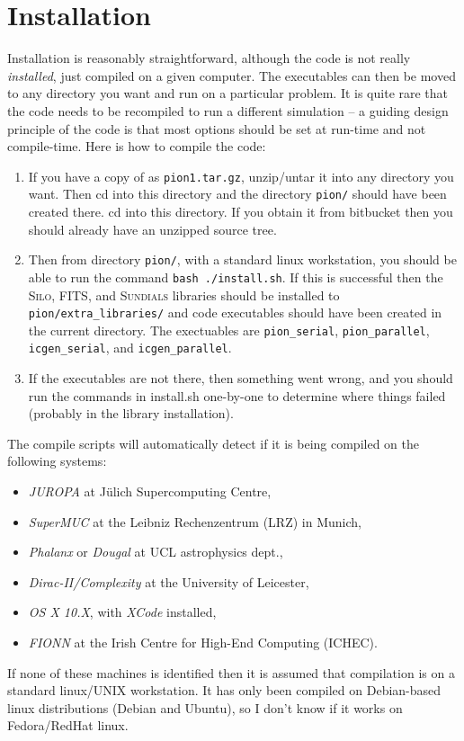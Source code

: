\documentclass[a4paper,11pt]{report}
\begin{document}
\section{Installation}
Installation is reasonably straightforward, although the code is not really \emph{installed}, just compiled on a given computer.
The executables can then be moved to any directory you want and run on a particular problem.
It is quite rare that the code needs to be recompiled to run a different simulation -- a guiding design principle of the code is that most options should be set at run-time and not compile-time.
Here is how to compile the code:
\begin{enumerate}
\item
  If you have a copy of \pion{} as \texttt{pion1.tar.gz}, unzip/untar it into any directory you want.
  Then cd into this directory and the directory \verb|pion/| should have been created there.  cd into this directory.
  If you obtain it from bitbucket then you should already have an unzipped source tree.
\item
  Then from directory \verb|pion/|, with a standard linux workstation, you should be able to run the command \verb|bash ./install.sh|.
  If this is successful then the \textsc{Silo}, \textsc{FITS}, and \textsc{Sundials} libraries should be installed to \verb|pion/extra_libraries/| and code executables should have been created in the current directory.
  The exectuables are \verb|pion_serial|, \verb|pion_parallel|, \verb|icgen_serial|, and \verb|icgen_parallel|.
\item
  If the executables are not there, then something went wrong, and you should run the commands in install.sh one-by-one to determine where things failed (probably in the library installation).
\end{enumerate}

The compile scripts will automatically detect if it is being compiled on the following systems:
\begin{itemize}
\item \emph{JUROPA} at J\"ulich Supercomputing Centre,
\item \emph{SuperMUC} at the Leibniz Rechenzentrum (LRZ) in Munich,
\item \emph{Phalanx} or \emph{Dougal} at UCL astrophysics dept.,
\item \emph{Dirac-II/Complexity} at the University of Leicester,
\item \emph{OS X 10.X}, with \emph{XCode} installed,
\item \emph{FIONN} at the Irish Centre for High-End Computing (ICHEC).
\end{itemize}
If none of these machines is identified then it is assumed that compilation is on a standard linux/UNIX workstation.
It has only been compiled on Debian-based linux distributions (Debian and Ubuntu), so I don't know if it works on Fedora/RedHat linux.
\end{document}
